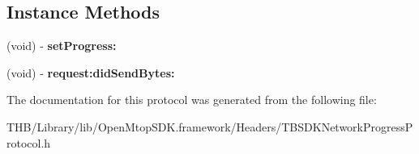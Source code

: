 \subsection*{Instance Methods}
\begin{DoxyCompactItemize}
\item 
\mbox{\label{protocol_t_b_s_d_k_network_progress_protocol_01-p_a1dd484fde034fbfd22006cddd844b7d6}} 
(void) -\/ {\bfseries set\+Progress\+:}
\item 
\mbox{\label{protocol_t_b_s_d_k_network_progress_protocol_01-p_ab50b31ea9b89b02b50cb6fc21be78d6d}} 
(void) -\/ {\bfseries request\+:did\+Send\+Bytes\+:}
\end{DoxyCompactItemize}


The documentation for this protocol was generated from the following file\+:\begin{DoxyCompactItemize}
\item 
T\+H\+B/\+Library/lib/\+Open\+Mtop\+S\+D\+K.\+framework/\+Headers/T\+B\+S\+D\+K\+Network\+Progress\+Protocol.\+h\end{DoxyCompactItemize}
